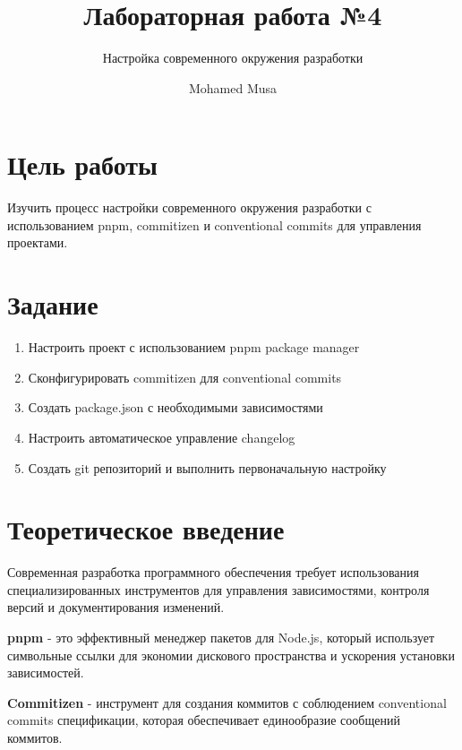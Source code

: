 \documentclass[
  12pt,
  a4paper,
  DIV=11,
  numbers=noendperiod]{scrreprt}
\title{Лабораторная работа №4}
\subtitle{Настройка современного окружения разработки}
\author{Mohamed Musa}
\date{}
\providecommand{\tightlist}{%
  \setlength{\itemsep}{0pt}\setlength{\parskip}{0pt}}\usepackage{longtable,booktabs,array}
\renewcommand*\contentsname{Содержание}
\newcommand\contentsname{Содержание}
\begin{document}
\maketitle

\renewcommand*\contentsname{Содержание}
{
\setcounter{tocdepth}{1}
\tableofcontents
}
\listoffigures
\listoftables
{}
\chapter{Цель
работы}\label{ux446ux435ux43bux44c-ux440ux430ux431ux43eux442ux44b}

Изучить процесс настройки современного окружения разработки с
использованием pnpm, commitizen и conventional commits для управления
проектами.

\chapter{Задание}\label{ux437ux430ux434ux430ux43dux438ux435}

\begin{enumerate}
\def\labelenumi{\arabic{enumi}.}
\tightlist
\item
  Настроить проект с использованием pnpm package manager
\item
  Сконфигурировать commitizen для conventional commits
\item
  Создать package.json с необходимыми зависимостями
\item
  Настроить автоматическое управление changelog
\item
  Создать git репозиторий и выполнить первоначальную настройку
\end{enumerate}

\chapter{Теоретическое
введение}\label{ux442ux435ux43eux440ux435ux442ux438ux447ux435ux441ux43aux43eux435-ux432ux432ux435ux434ux435ux43dux438ux435}

Современная разработка программного обеспечения требует использования
специализированных инструментов для управления зависимостями, контроля
версий и документирования изменений.

\textbf{pnpm} - это эффективный менеджер пакетов для Node.js, который
использует символьные ссылки для экономии дискового пространства и
ускорения установки зависимостей.

\textbf{Commitizen} - инструмент для создания коммитов с соблюдением
conventional commits спецификации, которая обеспечивает единообразие
сообщений коммитов.
\end{document}
